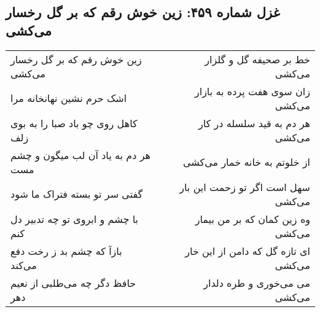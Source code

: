 \begin{center}
\section*{غزل شماره ۴۵۹: زین خوش رقم که بر گل رخسار می‌کشی}
\label{sec:sh459}
\begin{longtable}{l p{0.5cm} r}
زین خوش رقم که بر گل رخسار می‌کشی
&&
خط بر صحیفه گل و گلزار می‌کشی
\\
اشک حرم نشین نهانخانه مرا
&&
زان سوی هفت پرده به بازار می‌کشی
\\
کاهل روی چو باد صبا را به بوی زلف
&&
هر دم به قید سلسله در کار می‌کشی
\\
هر دم به یاد آن لب میگون و چشم مست
&&
از خلوتم به خانه خمار می‌کشی
\\
گفتی سر تو بسته فتراک ما شود
&&
سهل است اگر تو زحمت این بار می‌کشی
\\
با چشم و ابروی تو چه تدبیر دل کنم
&&
وه زین کمان که بر من بیمار می‌کشی
\\
بازآ که چشم بد ز رخت دفع می‌کند
&&
ای تازه گل که دامن از این خار می‌کشی
\\
حافظ دگر چه می‌طلبی از نعیم دهر
&&
می می‌خوری و طره دلدار می‌کشی
\\
\end{longtable}
\end{center}
